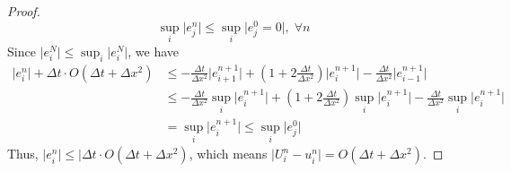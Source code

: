 \begin{answer}
\begin{proof}
        \begin{equation}
            \sup_{i} \lvert e_j^n \rvert \leq \sup_{i}\lvert e_{j}^{0} = 0 \rvert,\; \forall n
        \end{equation}
        Since $\lvert e_i^N \rvert \leq \sup_{i}\lvert e_i^N \rvert$, we have
        \begin{equation}
            \begin{aligned}
                \lvert e_{i}^{n} \rvert + \Delta t \cdot O(\Delta t + \Delta x^2) &\leq -\tfrac{\Delta t}{\Delta x^2}\lvert e_{i+1}^{n+1}\rvert + (1+2\tfrac{\Delta t}{\Delta x^2})\lvert e_{i}^{n+1}\rvert - \tfrac{\Delta t}{\Delta x^2} \lvert e_{i-1}^{n+1} \rvert\\
                & \leq -\tfrac{\Delta t}{\Delta x^2}\sup_{i}\lvert e_i^{n+1} \rvert + (1+2\tfrac{\Delta t}{\Delta x^2})\sup_{i}\lvert e_i^{n+1} \rvert - \tfrac{\Delta t}{\Delta x^2} \sup_{i}\lvert e_i^{n+1} \rvert\\
                &=\sup_{i}\lvert e_i^{n+1} \rvert \leq \sup_{i}\lvert e_{j}^{0} \rvert
            \end{aligned}
        \end{equation}
        Thus, $\lvert e_i^n \rvert \leq \lvert \Delta t \cdot O(\Delta t + \Delta x^2)$, which means $\lvert U_i^n - u_i^n \rvert = O(\Delta t + \Delta x^2)$.
    \end{proof}
\end{answer}